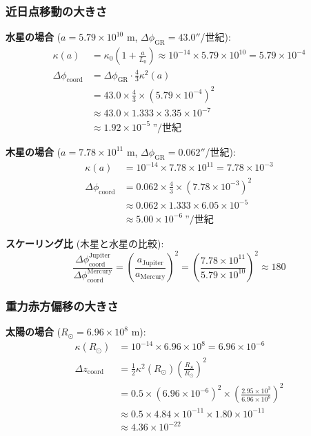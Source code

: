 \documentclass[11pt,a4paper]{article}
\begin{document}
	\subsubsection{近日点移動の大きさ}
	
	\textbf{水星の場合} ($a = 5.79 \times 10^{10}$ m, $\Delta\phi_{\text{GR}} = 43.0''$/世紀):
	\begin{align}
		\kappa(a) &= \kappa_0 \left(1 + \frac{a}{L_0}\right) 
		\approx 10^{-14} \times 5.79 \times 10^{10} = 5.79 \times 10^{-4} \\
		\Delta\phi_{\text{coord}} &= \Delta\phi_{\text{GR}} \cdot \frac{4}{3} \kappa^2(a) \\
		&= 43.0 \times \frac{4}{3} \times (5.79 \times 10^{-4})^2 \\
		&\approx 43.0 \times 1.333 \times 3.35 \times 10^{-7} \\
		&\approx 1.92 \times 10^{-5} \ \text{''}/\text{世紀}
	\end{align}
	
	\textbf{木星の場合} ($a = 7.78 \times 10^{11}$ m, $\Delta\phi_{\text{GR}} = 0.062''$/世紀):
	\begin{align}
		\kappa(a) &= 10^{-14} \times 7.78 \times 10^{11} = 7.78 \times 10^{-3} \\
		\Delta\phi_{\text{coord}} &= 0.062 \times \frac{4}{3} \times (7.78 \times 10^{-3})^2 \\
		&\approx 0.062 \times 1.333 \times 6.05 \times 10^{-5} \\
		&\approx 5.00 \times 10^{-6}~\text{''}/\text{世紀}
	\end{align}
	
	\textbf{スケーリング比} (木星と水星の比較):
	\begin{equation}
		\frac{\Delta\phi_{\text{coord}}^{\text{Jupiter}}}{\Delta\phi_{\text{coord}}^{\text{Mercury}}}
		= \left(\frac{a_{\text{Jupiter}}}{a_{\text{Mercury}}}\right)^2 
		= \left(\frac{7.78 \times 10^{11}}{5.79 \times 10^{10}}\right)^2 \approx 180
	\end{equation}
	
	\subsubsection{重力赤方偏移の大きさ}
	
	\textbf{太陽の場合} ($R_\odot = 6.96 \times 10^8$ m):
	\begin{align}
		\kappa(R_\odot) &= 10^{-14} \times 6.96 \times 10^8 = 6.96 \times 10^{-6} \\
		\Delta z_{\text{coord}} &= \frac{1}{2} \kappa^2(R_\odot) \left(\frac{R_S}{R_\odot}\right)^2 \\
		&= 0.5 \times (6.96 \times 10^{-6})^2 \times \left(\frac{2.95 \times 10^3}{6.96 \times 10^8}\right)^2 \\
		&\approx 0.5 \times 4.84 \times 10^{-11} \times 1.80 \times 10^{-11} \\
		&\approx 4.36 \times 10^{-22}
	\end{align}
	
\end{document}
